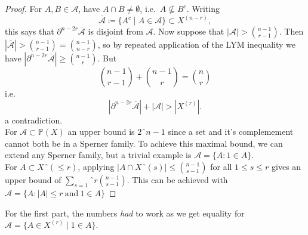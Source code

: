 \documentclass[a4paper]{article}
\renewcommand{\P}{\mathbb P}
\begin{document}
  \begin{proof}
  For $A,B \in \mathcal{A}$, have $A \cap B \neq \emptyset$, i.e.\ $A \nsubseteq B^c$.
  Writing
  \begin{equation*}\overline{\mathcal{A}} \coloneqq \{A^c \mid A \in \mathcal{A}\} \subset X^{(n-r)},\end{equation*}
  this says that $\partial^{n-2r}\overline{\mathcal{A}}$ is disjoint from $\mathcal{A}$.
  Now suppose that $|\mathcal{A}| > \binom{n-1}{r-1}$.
  Then $|\overline{\mathcal{A}}| > \binom{n-1}{r-1} = \binom{n-1}{n-r}$, so by
  repeated application of the LYM inequality we have $|\partial^{n-2r} \overline{\mathcal{A}}| \geq \binom{n-1}{r}$.
  But
  \begin{equation*}
    \binom{n-1}{r-1} + \binom{n-1}{r} = \binom{n}{r}
  \end{equation*}
  i.e.\
  \begin{equation*}
    |\partial^{n-2r} \overline{\mathcal{A}}| + |\mathcal{A}| > |X^{(r)}|.
  \end{equation*}
  a contradiction.\\

  For $\mathcal{A} \subset \P(X)$ an upper bound is $2ˆ{n-1}$ since a set and
  it's complemement cannot both be in a Sperner family. To achieve this maximal
  bound, we can extend any Sperner family, but a trivial example is $\mathcal{A}
  = \{ A : 1 \in A\}$.\\

  For $A \subset Xˆ{(\leq r)}$, applying $|A \cap Xˆ{(s)}| \leq \binom{n-1}{s-1}$ for
  all $1 \leq s \leq r$ gives an upper bound of $\sum_{s=1}ˆ{r}
  \binom{n-1}{s-1}$. This can be achieved with $\mathcal{A} = \{ A : |A| \leq r
  \ \text{and} \ 1 \in A\}$ 
\end{proof}
\begin{remark}
  For the first part, the numbers \emph{had} to work as we get equality for $\mathcal{A} = \{A \in X^{(r)} \mid 1 \in A\}$.
\end{remark}
\end{document}
